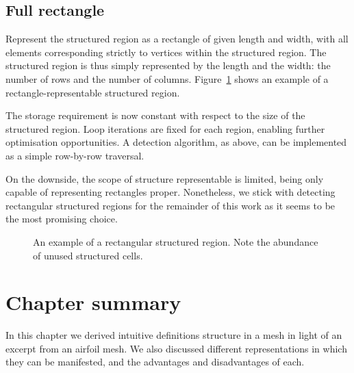 \subsection{Full rectangle}

Represent the structured region as a rectangle of given length and width, with all elements corresponding strictly to vertices within the structured region. The structured region is thus simply represented by the length and the width: the number of rows and the number of columns. Figure~\ref{fig:rectangle} shows an example of a rectangle-representable structured region.

The storage requirement is now constant with respect to the size of the structured region.
Loop iterations are fixed for each region, enabling further optimisation opportunities.
A detection algorithm, as above, can be implemented as a simple row-by-row traversal.

On the downside, the scope of structure representable is limited, being only capable of representing rectangles proper. Nonetheless, we stick with detecting rectangular structured regions for the remainder of this work as it seems to be the most promising choice.

\begin{figure}
\drawmatrix[cell wd=0.8, cell ht=0.8]{\bitmapmatrix}
\caption{An example of a rectangular structured region. Note the abundance of unused structured cells.}
\label{fig:rectangle}
\end{figure}

\section{Chapter summary}
In this chapter we derived intuitive definitions structure in a mesh in light of an excerpt from an airfoil mesh. We also discussed different representations in which they can be manifested, and the advantages and disadvantages of each.